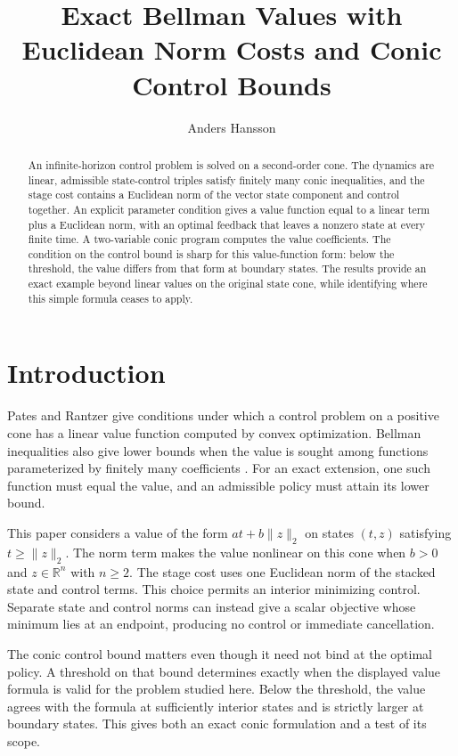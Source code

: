 \documentclass[10pt]{article}
\title{Exact Bellman Values with Euclidean Norm Costs and Conic Control Bounds}
\author{Anders Hansson}
\date{}
\newcommand{\R}{\mathbb R}
\begin{document}
\maketitle

\begin{abstract}
An infinite-horizon control problem is solved on a second-order cone. The dynamics are linear, admissible state-control triples satisfy finitely many conic inequalities, and the stage cost contains a Euclidean norm of the vector state component and control together. An explicit parameter condition gives a value function equal to a linear term plus a Euclidean norm, with an optimal feedback that leaves a nonzero state at every finite time. A two-variable conic program computes the value coefficients. The condition on the control bound is sharp for this value-function form: below the threshold, the value differs from that form at boundary states. The results provide an exact example beyond linear values on the original state cone, while identifying where this simple formula ceases to apply.
\end{abstract}

\section{Introduction}

Pates and Rantzer \cite{pates-rantzer} give conditions under which a control problem on a positive cone has a linear value function computed by convex optimization. Bellman inequalities also give lower bounds when the value is sought among functions parameterized by finitely many coefficients \cite{de-farias-van-roy}. For an exact extension, one such function must equal the value, and an admissible policy must attain its lower bound.

This paper considers a value of the form $a t+b\|z\|_2$ on states $(t,z)$ satisfying $t\geq\|z\|_2$. The norm term makes the value nonlinear on this cone when $b>0$ and $z\in\R^n$ with $n\geq2$. The stage cost uses one Euclidean norm of the stacked state and control terms. This choice permits an interior minimizing control. Separate state and control norms can instead give a scalar objective whose minimum lies at an endpoint, producing no control or immediate cancellation.

The conic control bound matters even though it need not bind at the optimal policy. A threshold on that bound determines exactly when the displayed value formula is valid for the problem studied here. Below the threshold, the value agrees with the formula at sufficiently interior states and is strictly larger at boundary states. This gives both an exact conic formulation and a test of its scope.
\end{document}
